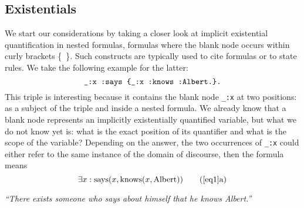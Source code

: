 \subsection{Existentials}\label{existentials}
We start our considerations by taking a closer look at implicit existential quantification in nested formulas, 
\ie formulas where the blank node occurs within curly brackets \{~\}.  Such constructs are typically used to cite formulas or
to state rules. We take the following example for the latter:
% 
\begin{equation}\label{eq1}
\verb!_:x :says {_:x :knows :Albert.}.!
 \end{equation}
This triple is interesting because it contains the blank node \texttt{\_:x} at two positions: as a subject of the triple and inside a nested formula. We already know 
that a blank node represents an implicitly existentially quantified variable, but what we do not know yet is: what is the exact position of its quantifier 
and what is the scope of the variable? Depending on the answer, the two occurrences of \texttt{\_:x} could either refer to the same instance of the domain of discourse, 
then the formula means
%
\[\exists x : \text{says}(x, \text{knows}(x, \text{Albert})) \tag{\ref{eq1}a} \label{zwei}\]
\begin{center}\textit{``There exists someone who says about himself that he knows Albert.''}
  \end{center}
